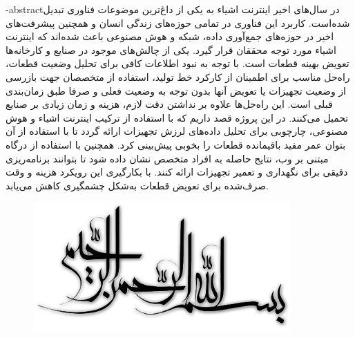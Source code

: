 
\fa-abstract{در سال‌های اخیر اینترنت اشیاء به یکی از داغ‌ترین موضوعات فناوری تبدیل شده‌است. کاربرد این فناوری در تمامی حوزه‌های زندگی انسان و همچنین پیشرفت‌های اخیر در حوزه‌های جمع‌آوری داده، شبکه و هوش مصنوعی باعث شده‌اند که اینترنت اشیاء مورد توجه محققان قرار گیرد. یکی از چالش‌های موجود در صنایع و کارخانه‌ها تعویض بهینه قطعات است. با توجه به نبود اطلاعات کافی برای تحلیل وضعیت قطعات، راه‌حل مناسب برای اطمینان از کارکرد خط تولید، استفاده از متخصصان جهت بازرسی از وضعیت تجهیزات یا تعویض آنها بدون توجه به وضعیت فعلی و صرفا طبق زمان‌بندی قبلی است. این راه‌حل‌ها علاوه بر نداشتن دقت لازم، هزینه و زمان زیادی بر صنایع تحمیل می‌کنند. در این پروژه قصد داریم که با استفاده از ترکیب اینترنت اشیاء و هوش مصنوعی، چارچوبی برای تحلیل داده‌های لرزش تجهیزات ارائه گردد تا با استفاده از آن بتوان عمر مفید باقیمانده قطعات را بخوبی پیش‌بینی کرد. همچنین با استفاده از درگاه مبتنی بر وب، نتایج حاصله به افراد متخصص نشان داده شود تا بتوانند برنامه‌ریزی دقیقی برای نگهداری و تعمیر تجهیزات ارائه کنند. با بکارگیری این رویکرد هزینه و وقت صرف‌شده برای تعویض قطعات به‌شکل چشمگیری کاهش می‌یابد.}





\AUTtitle
\vspace*{7cm}
\thispagestyle{empty}
\begin{center}
\includegraphics[height=5cm,width=12cm]{besm}
\end{center}